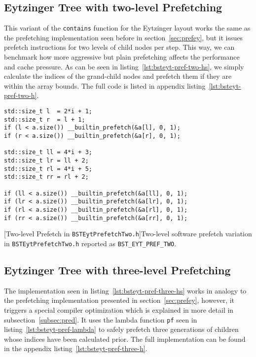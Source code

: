 \documentclass{article}
\begin{document}
\subsection{Eytzinger Tree with two-level Prefetching}
This variant of the \texttt{contains} function for the Eytzinger layout works the same as the prefetching implementation seen before in section~\ref{sec:prefey}, but it issues prefetch instructions for two levels of child nodes per step. This way, we can benchmark how more aggressive but plain prefetching affects the performance and cache pressure. As can be seen in listing~\ref{lst:bsteyt-pref-two-hs}, we simply calculate the indices of the grand-child nodes and prefetch them if they are within the array bounds. The full code is listed in appendix listing~\ref{lst:bsteyt-pref-two-h}.
 
\begin{lstlisting}
std::size_t l  = 2*i + 1;
std::size_t r  = l + 1;
if (l < a.size()) __builtin_prefetch(&a[l], 0, 1);
if (r < a.size()) __builtin_prefetch(&a[r], 0, 1);

std::size_t ll = 4*i + 3;   
std::size_t lr = ll + 2;    
std::size_t rl = 4*i + 5;   
std::size_t rr = rl + 2;    

if (ll < a.size()) __builtin_prefetch(&a[ll], 0, 1);
if (lr < a.size()) __builtin_prefetch(&a[lr], 0, 1);
if (rl < a.size()) __builtin_prefetch(&a[rl], 0, 1);
if (rr < a.size()) __builtin_prefetch(&a[rr], 0, 1);
\end{lstlisting}
[Two-level Prefetch in \texttt{BSTEytPrefetchTwo.h}]{Two-level software
prefetch variation in \texttt{BSTEytPrefetchTwo.h} reported as \texttt{{BST\_EYT\_PREF\_TWO}}.}
\label{lst:bsteyt-pref-two-hs}

\subsection{Eytzinger Tree with three-level Prefetching}
\label{sec:tree}
The implementation seen in listing~\ref{lst:bsteyt-pref-three-hs} works in analogy to the prefetching implementation presented in section~\ref{sec:prefey}, however, it triggers a special compiler optimization which is explained in more detail in subsection~\ref{subsec:pred}. It uses the lambda function \texttt{pf} seen in listing~\ref{lst:bsteyt-pref-lambda} to safely prefetch three generations of children whose indices have been calculated prior. The full implementation can be found in the appendix listing~\ref{lst:bsteyt-pref-three-h}.
\end{document}
